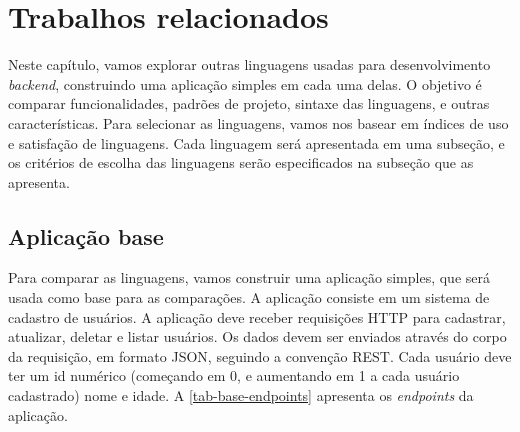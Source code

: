 
\chapter{Trabalhos relacionados}

Neste capítulo, vamos explorar outras linguagens usadas para desenvolvimento \textit{backend},
construindo uma aplicação simples em cada uma delas. O objetivo é comparar funcionalidades,
padrões de projeto, sintaxe das linguagens, e outras características. Para selecionar
as linguagens, vamos nos basear em índices de uso e satisfação de linguagens. Cada
linguagem será apresentada em uma subseção, e os critérios de escolha das linguagens
serão especificados na subseção que as apresenta.

\section{Aplicação base}\label{sec:aplicacao-base}

Para comparar as linguagens, vamos construir uma aplicação simples, que será usada
como base para as comparações. A aplicação consiste em um sistema de cadastro de
usuários. A aplicação deve receber requisições HTTP para cadastrar, atualizar, deletar
e listar usuários. Os dados devem ser enviados através do corpo da requisição, em
formato JSON, seguindo a convenção REST. Cada usuário deve ter um id numérico
(começando em 0, e aumentando em 1 a cada usuário cadastrado) nome e idade. A
\autoref{tab-base-endpoints} apresenta os \textit{endpoints} da aplicação.


